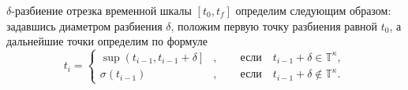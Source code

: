 \begin{definition}
	$\delta$-разбиение отрезка временной шкалы $[t_0, t_f]$
	определим следующим образом: задавшись диаметром разбиения
	$\delta$, положим первую точку разбиения равной $t_0$, а
	дальнейшие точки определим по формуле
	\[
	t_i = \left\{
	\begin{aligned}
	\sup{\left(t_{i-1}, t_{i-1}+\delta\right]}&, \qquad
	\text{если}\quad t_{i-1}+ \delta \in \mathbb{T}^\kappa, \\
	\sigma(t_{i-1}) &, \qquad \text{если}\quad t_{i-1}+\delta \notin \mathbb{T}^\kappa.
	\end{aligned}
	\right.
	\]
\end{definition}